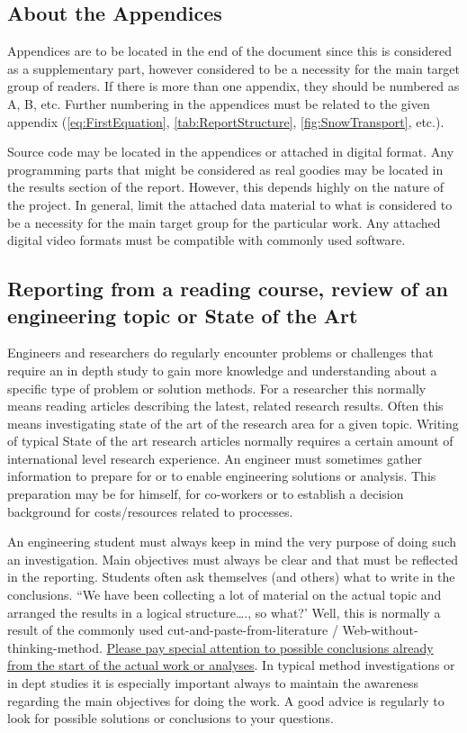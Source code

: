 \documentclass[a4paper,12pt]{extarticle}
\begin{document}
\subsection{About the Appendices}
Appendices are to be located in the end of the document since this is considered as a supplementary part, however considered to be a necessity for the main target group of readers. If there is more than one appendix, they should be numbered as A, B, etc. Further numbering in the appendices must be related to the given appendix (\cref{eq:FirstEquation}, \cref{tab:ReportStructure}, \cref{fig:SnowTransport}, etc.). 

Source code may be located in the appendices or attached in digital format. Any programming parts that might be considered as real goodies may be located in the results section of the report. However, this depends highly on the nature of the project. In general, limit the attached data material to what is considered to be a necessity for the main target group for the particular work. Any attached digital video formats must be compatible with commonly used software.

\subsection{Reporting from a reading course, review of an engineering topic or State of the Art}
Engineers and researchers do regularly encounter problems or challenges that require an in depth study to gain more knowledge and understanding about a specific type of problem or solution methods. For a researcher this normally means reading articles describing the latest, related research results. Often this means investigating state of the art of the research area for a given topic. Writing of typical State of the art research articles normally requires a certain amount of international level research experience. An engineer must sometimes gather information to prepare for or to enable engineering solutions or analysis. This preparation may be for himself, for co-workers or to establish a decision background for costs/resources related to processes. 

An engineering student must always keep in mind the very purpose of doing such an investigation. Main objectives must always be clear and that must be reflected in the reporting. Students often ask themselves (and others) what to write in the conclusions. “We have been collecting a lot of material on the actual topic and arranged the results in a logical structure…., so what?’ Well, this is normally a result of the commonly used cut-and-paste-from-literature / Web-without-thinking-method. \ul{Please pay special attention to possible conclusions already from the start of the actual work or analyses}. In typical method investigations or in dept studies it is especially important always to maintain the awareness regarding the main objectives for doing the work. A good advice is regularly to look for possible solutions or conclusions to your questions.
\end{document}
